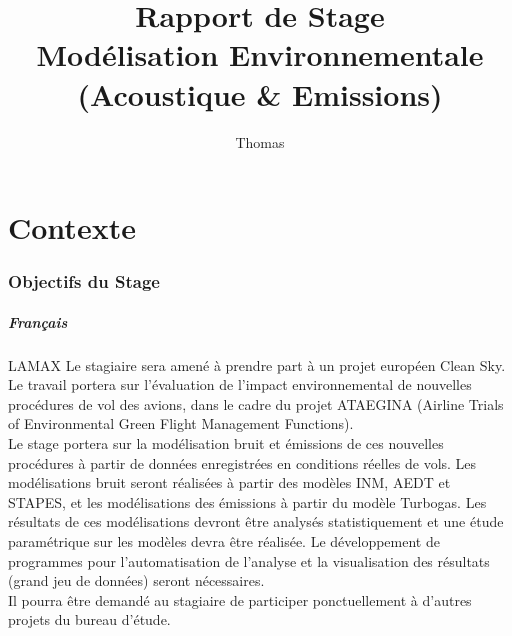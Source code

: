\documentclass[a4paper]{article}
\begin{document}
    \title{
        Rapport de Stage\\
        Modélisation Environnementale\\
        (Acoustique \& Emissions)
    }
    \author{Thomas }
    \maketitle
    \vfill
    \newpage
    
    \tableofcontents
    \newpage
    
    \printglossaries
    \listoffigures
    \listoftables
    \newpage
    
    \part{Contexte}
    \section{Objectifs du Stage}
    \subsubsection*{Français}
    \gls{LAMAX}
    Le stagiaire sera amené à prendre part à un projet européen Clean Sky. Le travail portera sur l'évaluation de l'impact environnemental de nouvelles procédures de vol des avions, dans le cadre du projet ATAEGINA (Airline Trials of Environmental Green Flight Management Functions).\\
    Le stage portera sur la modélisation bruit et émissions de ces nouvelles procédures à partir de données enregistrées en conditions réelles de vols. Les modélisations bruit seront réalisées à partir des modèles INM, AEDT et STAPES, et les modélisations des émissions à partir du modèle Turbogas. Les résultats de ces modélisations devront être analysés statistiquement et une étude paramétrique sur les modèles devra être réalisée. Le développement de programmes pour l'automatisation de l'analyse et la visualisation des résultats (grand jeu de données) seront nécessaires.\\
    Il pourra être demandé au stagiaire de participer ponctuellement à d'autres projets du bureau d'étude.
\end{document}
